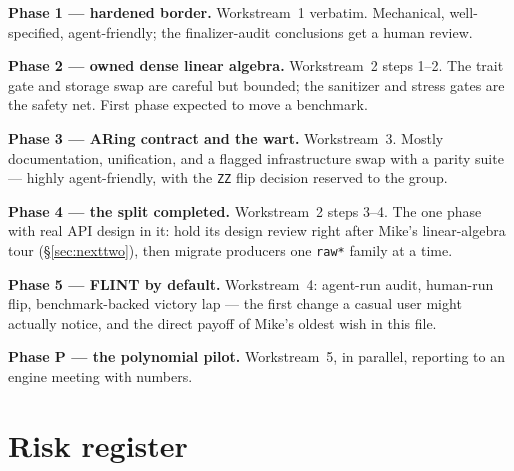 \documentclass[11pt,oneside]{report}
\newcommand{\code}[1]{\textcolor{m2code}{\texttt{#1}}}
\begin{document}
\textbf{Phase 1 --- hardened border.} Workstream~1 verbatim. Mechanical,
well-specified, agent-friendly; the finalizer-audit conclusions get a
human review.

\textbf{Phase 2 --- owned dense linear algebra.} Workstream~2 steps 1--2.
The trait gate and storage swap are careful but bounded; the sanitizer and
stress gates are the safety net. First phase expected to move a benchmark.

\textbf{Phase 3 --- ARing contract and the wart.} Workstream~3. Mostly
documentation, unification, and a flagged infrastructure swap with a parity
suite --- highly agent-friendly, with the \code{ZZ} flip decision reserved
to the group.

\textbf{Phase 4 --- the split completed.} Workstream~2 steps 3--4. The one
phase with real API design in it: hold its design review right after
Mike's linear-algebra tour (\S\ref{sec:nexttwo}), then migrate producers
one \code{raw*} family at a time.

\textbf{Phase 5 --- FLINT by default.} Workstream~4: agent-run audit,
human-run flip, benchmark-backed victory lap --- the first change a casual
user might actually notice, and the direct payoff of Mike's oldest wish in
this file.

\textbf{Phase P --- the polynomial pilot.} Workstream~5, in parallel,
reporting to an engine meeting with numbers.

\section{Risk register}
\label{sec:risks}
\end{document}
